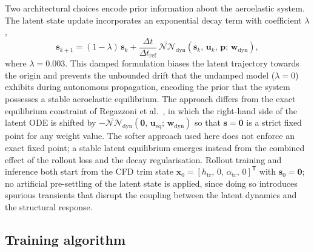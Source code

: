Two architectural choices encode prior information about the aeroelastic system. The
latent state update incorporates an exponential decay term with coefficient $\lambda$,
\begin{equation}
\mathbf{s}_{k+1} = (1-\lambda)\,\mathbf{s}_k
    + \frac{\Delta t}{\Delta t_\mathrm{ref}}\,
    \widetilde{\mathcal{NN}}_\mathrm{dyn}\!\left(
        \mathbf{s}_k,\, \mathbf{u}_k,\, \mathbf{p};\, \mathbf{w}_\mathrm{dyn}
    \right),
\label{eq:latent_dyn}
\end{equation}
where $\lambda = 0.003$. This damped formulation biases the latent trajectory towards the
origin and prevents the unbounded drift that the undamped model ($\lambda = 0$) exhibits
during autonomous propagation, encoding the prior that the system possesses a stable
aeroelastic equilibrium. The approach differs from the exact equilibrium constraint of
Regazzoni et al.~\cite{Regazzoni2024}, in which the right-hand side of the latent ODE is
shifted by $-\widetilde{\mathcal{NN}}_\mathrm{dyn}(\mathbf{0},\,\mathbf{u}_\mathrm{eq};\,
\mathbf{w}_\mathrm{dyn})$ so that $\mathbf{s} = \mathbf{0}$ is a strict fixed point for
any weight value. The softer approach used here does not enforce an exact fixed point; a
stable latent equilibrium emerges instead from the combined effect of the rollout loss and
the decay regularisation. Rollout training and inference both start from the CFD trim state
$\mathbf{x}_0 = [h_\mathrm{tr},\,0,\,\alpha_\mathrm{tr},\,0]^\mathsf{T}$ with
$\mathbf{s}_0 = \mathbf{0}$; no artificial pre-settling of the latent state is applied,
since doing so introduces spurious transients that disrupt the coupling between the latent
dynamics and the structural response.

\subsection{Training algorithm}

